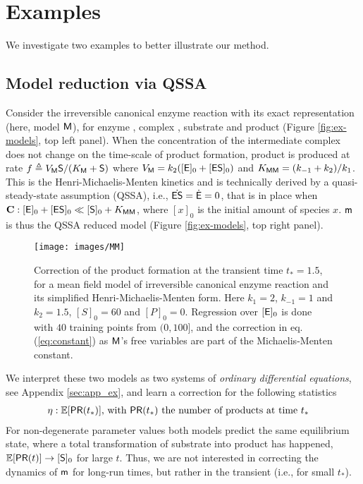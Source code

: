 \documentclass[runningheads,a4paper]{llncs}
\newcommand{\bM}{{\sf{M}}}
\newcommand{\bm}{{\sf{m}}}
\newcommand{\tstat}{\eta} %
\newcommand{\QSSA}{{\sf QSSA}}
\newcommand{\deriv}[1]{\dot{{#1}}}
\newcommand{\E}{{\sf{E}}}
\newcommand{\ES}{{{\sf{ES}}} }
\newcommand{\SU}{{{\sf{S}}}}
\newcommand{\PR}{{{\sf{PR}}}}
\newcommand{\COND}{{{\bf  C}}}
\begin{document}
\section{Examples}

We investigate two examples to better illustrate our method.

\subsection{Model reduction via \QSSA{}} \label{sec:examp1}




Consider the irreversible canonical enzyme reaction with its exact representation (here,  model $\bM$),  for enzyme \E{}, complex \ES{}, substrate \SU{} and product \PR{} (Figure \ref{fig:ex-models}, top left panel).
When the concentration of the intermediate complex does not change on the time-scale of product formation, product is  produced at rate $f \triangleq {V_{\sf M}\SU{}}/(K_{\sf M} + \SU{})$ where $V_{\sf M} = k_2([\E{}]_0 + [\ES{}]_0) $ and $K_{\sf MM}=({k_{-1} + k_2})/{k_1}$.
This  is     the    Henri-Michaelis-Menten kinetics 
and is technically derived by a quasi-steady-state assumption (\QSSA{}), i.e., $\deriv{\ES{}}= \deriv{\E{}}=0$, that is in place when
$\COND:  [\E{}]_0 + [\ES{}]_0 \ll [\SU{}]_0 + K_{\sf MM}$, where $[x]_0$ is the initial amount of species $x$.  $\bm$ is thus the \QSSA{} reduced model (Figure \ref{fig:ex-models}, top right panel). 


\begin{figure}[t]\center
\texttt{[image: images/MM]}
\caption{Correction of the product formation at the transient time $t_\ast=1.5$, for a mean field model of irreversible canonical enzyme reaction and its simplified Henri-Michaelis-Menten form. Here  $k_1  = 2$, $k_{-1}=1$ and $k_2  = 1.5$, $[S]_0=60$ and $[P]_0=0$.  Regression over $[\E{}]_0$ is done with $40$ training points from $(0,100]$, and the correction in eq. (\ref{eq:constant})  as $\bM$'s free variables are part of the Michaelis-Menten constant.}
\label{fig:ex-mm}
\end{figure}



We interpret these two models as two systems of {\em ordinary differential equations}, see Appendix \ref{sec:app_ex}, and learn a correction for the following statistics
\begin{align}
\tstat &: \mathbb{E}[\PR(t_\ast)]  \text{, with }  \PR(t_\ast) \text{ the number of products at time } t_\ast
\end{align}
For non-degenerate parameter values both models predict the same equilibrium state, where a total transformation of substrate into product has happened, $\mathbb{E}[\PR(t)]   \to [\SU{}]_0$ for large $t$.  Thus,  we are not interested in correcting the dynamics of $\bm$ for long-run times, but rather in the transient (i.e., for small $t_\ast$). 
\end{document}
